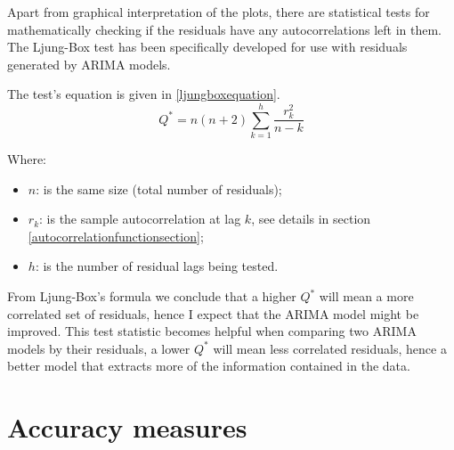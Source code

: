 \documentclass[12pt,a4paper,titlepage]{report}
\begin{document}
Apart from graphical interpretation of the plots, there are statistical tests for mathematically checking if the residuals have any autocorrelations left in them. The Ljung-Box test has been specifically developed for use with residuals generated by ARIMA models.

The test's equation is given in \ref{ljungboxequation}.
\begin{equation}
Q^* = n(n+2) \sum_{k=1}^h \frac{r_k^2}{n-k}
\label{ljungboxequation}
\end{equation}

Where:
\begin{itemize}
    \item $ n $: is the same size (total number of residuals);
    \item $ r_{k} $: is the sample autocorrelation at lag $ k $, see details in section \ref{autocorrelationfunctionsection};
    \item $ h $: is the number of residual lags being tested.
\end{itemize}

From Ljung-Box's formula we conclude that a higher $ Q^* $ will mean a more correlated set of residuals, hence I expect that the ARIMA model might be improved. This test statistic becomes helpful when comparing two ARIMA models by their residuals, a lower $ Q^* $ will mean less correlated residuals, hence a better model that extracts more of the information contained in the data. \cite{ljungboxtest}

%
%
%

\section{Accuracy measures} \label{accuracymeasuressection}
\end{document}
